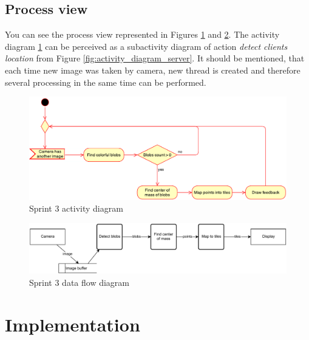 \subsection{Process view}
You can see the process view represented in Figures \ref{fig:sprint3_activity_diagram} and \ref{fig:sprint3_dfd}. The activity diagram \ref{fig:sprint3_activity_diagram} can be perceived as a subactivity diagram of action \emph{detect clients location} from Figure \ref{fig:activity_diagram_server}.
It should be mentioned, that each time new image was taken by camera, new thread is created and therefore several processing in the same time can be performed.

\begin{figure}[H]
	\centering
		\includegraphics[width=16.2cm]{sprint3/activity_sprint3.pdf}
	\caption{Sprint 3 activity diagram}
	\label{fig:sprint3_activity_diagram}
\end{figure}


\begin{figure}[H]
	\centering
		\includegraphics[width=16.2cm]{sprint3/sprint3_dtd.pdf}
	\caption{Sprint 3 data flow diagram}
	\label{fig:sprint3_dfd}
\end{figure}


\section{Implementation}

